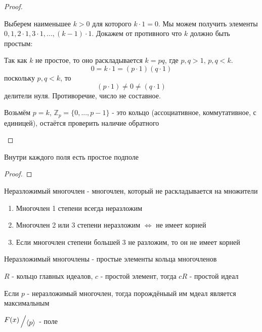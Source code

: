\documentclass[../main/document.tex]{subfiles}
\begin{document}
\begin{thm}
\begin{proof}
\begin{enumerate}
Выберем наименьшее $k>0$ для которого $k\cdot 1=0$. Мы можем получить элементы $0,1,2\cdot 1,3\cdot 1,...,(k-1)\cdot 1$. Докажем от противного что $k$ должно быть простым:

Так как $k$ не простое, то оно раскладывается $k=pq$, где $p,q>1,\,p,q<k$.
$$0=k\cdot 1=(p\cdot 1)(q\cdot 1)$$
поскольку $p,q<k$, то
$$(p\cdot 1)\neq 0\neq (q\cdot 1)$$
делители нуля. Противоречие, число не составное.

Возьмём $p=k$, $\mathbb{Z}_p=\{0,...,p-1\}$ - это кольцо (ассоциативное, коммутативное, с единицей), остаётся проверить наличие обратного
\end{enumerate}
\end{proof}
\end{thm}
\begin{cnsq}
Внутри каждого поля есть простое подполе
\begin{proof}

\end{proof}
\end{cnsq}
\begin{dfn}

\end{dfn}
\begin{dfn}
Неразложимый многочлен - многочлен, который не раскладывается на множители
\end{dfn}
\begin{cnsq}
\begin{enumerate}
\item Многочлен 1 степени всегда неразложим
\item Многочлен 2 или 3 степени неразложим $\Leftrightarrow$ не имеет корней
\item Если многочлен степени большей 3 не разложим, то он не имеет корней
\end{enumerate}
\end{cnsq}
\begin{cnsq}
Неразложимый многочлены - простые элементы кольца многочленов
\end{cnsq}
\begin{thm}
$R$ - кольцо главных идеалов, $c$ - простой элемент, тогда $cR$ - простой идеал
\end{thm}
\begin{cnsq}
Если $p$ - неразложимый многочлен, тогда порождёныый им мдеал является максимальным
\end{cnsq}
\begin{cnsq}
$\bigslant{F(x)}{\langle p\rangle}$ - поле
\end{cnsq}
\end{document}
